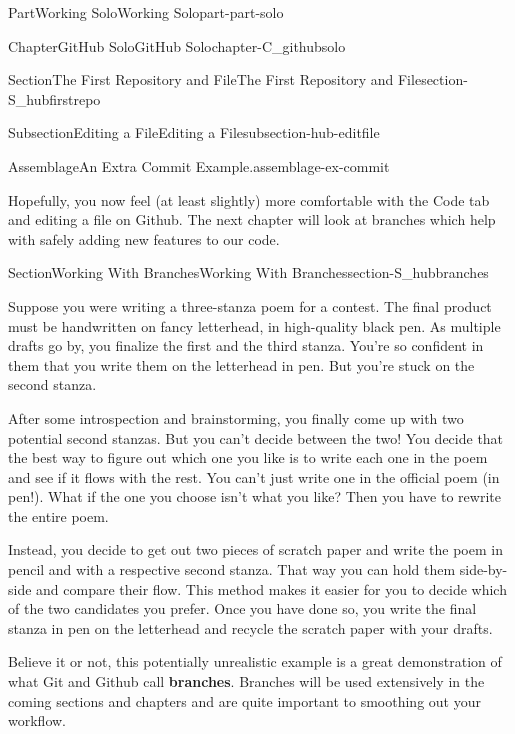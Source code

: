 \documentclass[twoside,10pt,]{book}
\newcommand{\terminology}[1]{\textbf{#1}}
\begin{document}
\begin{partptx}{Part}{Working Solo}{}{Working Solo}{}{}{part-part-solo}
\begin{chapterptx}{Chapter}{GitHub Solo}{}{GitHub Solo}{}{}{chapter-C_githubsolo}
\begin{sectionptx}{Section}{The First Repository and File}{}{The First Repository and File}{}{}{section-S_hubfirstrepo}
\begin{subsectionptx}{Subsection}{Editing a File}{}{Editing a File}{}{}{subsection-hub-editfile}
\begin{assemblage}{Assemblage}{An Extra Commit Example.}{assemblage-ex-commit}
\end{assemblage}
\end{subsectionptx}
\begin{conclusion}{}%
Hopefully, you now feel (at least slightly) more comfortable with the Code tab and editing a file on Github. The next chapter will look at branches which help with safely adding new features to our code.%
\end{conclusion}%
\end{sectionptx}
%
%
\typeout{************************************************}
\typeout{************************************************}
%
\begin{sectionptx}{Section}{Working With Branches}{}{Working With Branches}{}{}{section-S_hubbranches}
%
%
\begin{introduction}{}%
Suppose you were writing a three-stanza poem for a contest. The final product must be handwritten on fancy letterhead, in high-quality black pen. As multiple drafts go by, you finalize the first and the third stanza. You're so confident in them that you write them on the letterhead in pen. But you're stuck on the second stanza.%
\par
After some introspection and brainstorming, you finally come up with two potential second stanzas. But you can't decide between the two! You decide that the best way to figure out which one you like is to write each one in the poem and see if it flows with the rest. You can't just write one in the official poem (in pen!). What if the one you choose isn't what you like? Then you have to rewrite the entire poem.%
\par
Instead, you decide to get out two pieces of scratch paper and write the poem in pencil and with a respective second stanza. That way you can hold them side-by-side and compare their flow. This method makes it easier for you to decide which of the two candidates you prefer. Once you have done so, you write the final stanza in pen on the letterhead and recycle the scratch paper with your drafts.%
\par
Believe it or not, this potentially unrealistic example is a great demonstration of what Git and Github call \terminology{branches}. Branches will be used extensively in the coming sections and chapters and are quite important to smoothing out your workflow.%
\end{introduction}%
%
%
\typeout{************************************************}

\end{sectionptx}
\end{chapterptx}
\end{partptx}
\end{document}
